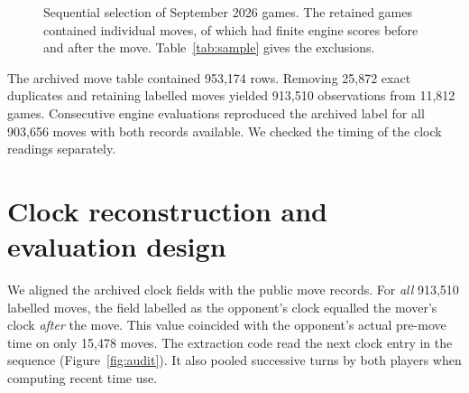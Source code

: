 \documentclass[10pt,a4paper]{article}
\begin{document}
\begin{figure}[H]\centering
{}
\caption{Sequential selection of September 2026 games. The \VerifiedGames{} retained games contained \RebuiltMoves{} individual moves, of which \VerifiedMoves{} had finite engine scores before and after the move. Table~\ref{tab:sample} gives the exclusions.}\label{fig:cohort}
\end{figure}

The archived move table contained 953,174 rows. Removing 25,872 exact duplicates and retaining labelled moves yielded 913,510 observations from 11,812 games. Consecutive engine evaluations reproduced the archived label for all 903,656 moves with both records available. We checked the timing of the clock readings separately.

\clearpage
\section{Clock reconstruction and evaluation design}
We aligned the archived clock fields with the public move records. For \emph{all} 913,510 labelled moves, the field labelled as the opponent's clock equalled the mover's clock \emph{after} the move. This value coincided with the opponent's actual pre-move time on only 15,478 moves. The extraction code read the next clock entry in the sequence (Figure~\ref{fig:audit}). It also pooled successive turns by both players when computing recent time use.
\end{document}
